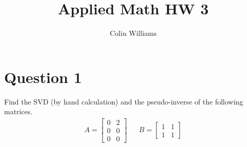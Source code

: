 \documentclass[10pt,a4paper]{article}
\title{Applied Math HW 3}
\author{Colin Williams}
\theoremstyle{definition}
\theoremstyle{definition}
\numberwithin{equation}{section}
\begin{document}
\maketitle

\section*{Question 1}
Find the SVD (by hand calculation) and the pseudo-inverse of the following matrices. 
\begin{align*}
A = \begin{bmatrix}
0 & 2\\
0 & 0\\
0 & 0
\end{bmatrix}
&& B = \begin{bmatrix}
1 & 1\\
1 & 1
\end{bmatrix}
\end{align*}
\end{document}
